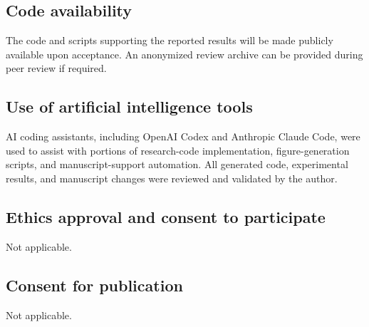 \documentclass[11pt,a4paper]{article}
\begin{document}
\subsection*{Code availability}
The code and scripts supporting the reported results will be made publicly available upon acceptance.
An anonymized review archive can be provided during peer review if required.

\subsection*{Use of artificial intelligence tools}
AI coding assistants, including OpenAI Codex and Anthropic Claude Code, were used to assist with portions of research-code implementation, figure-generation scripts, and manuscript-support automation.
All generated code, experimental results, and manuscript changes were reviewed and validated by the author.

\subsection*{Ethics approval and consent to participate}
Not applicable.

\subsection*{Consent for publication}
Not applicable.



\end{document}
